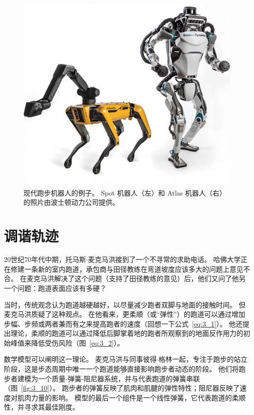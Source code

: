 \begin{figure}[!htb]
	\centering
	\includegraphics[width=1.0\linewidth]{chap3/3_9}
	\caption{现代跑步机器人的例子。
		Spot 机器人（左）和 Atlas 机器人（右）的照片由波士顿动力公司提供。 \label{fig:3_9}}
\end{figure}


\section{调谐轨迹}

20世纪70年代中期，托马斯$\cdot$麦克马洪接到了一个不寻常的求助电话。
哈佛大学正在修建一条新的室内跑道，承包商与田径教练在弯道坡度应该多大的问题上意见不合\cite{wingerson1983lion}。
在麦克马洪解决了这个问题（支持了田径教练的意见）后，他们又问了他另一个问题：跑道表面应该有多硬？


当时，传统观念认为跑道越硬越好，以尽量减少跑者双脚与地面的接触时间。
但麦克马洪质疑了这种观点。
在他看来，更柔顺（或“弹性”）的跑道可以通过增加步幅、步频或两者兼而有之来提高跑者的速度（回想一下公式~\ref{eq:3_1}）。
他还提出理论，柔顺的跑道可以通过降低后脚掌着地的跑者所观察到的地面反作用力的初始峰值来降低受伤风险（图~\ref{eq:3_2}）。


数学模型可以阐明这一理论。
麦克马洪与同事彼得$\cdot$格林一起，专注于跑步的站立阶段，这是步态周期中唯一一个跑道能够直接影响跑步者动态的阶段。
他们将跑步者建模为一个质量-弹簧-阻尼器系统，并与代表跑道的弹簧串联（图~\ref{fig:3_10}）。
跑步者的弹簧反映了肌肉和肌腱的弹性特性；阻尼器反映了速度对肌肉力量的影响。
模型的最后一个组件是一个线性弹簧，它代表跑道的柔顺性，并寻求其最佳刚度。


